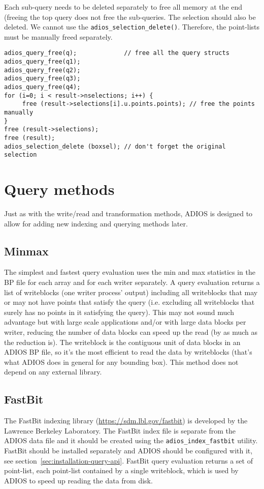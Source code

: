 Each sub-query needs to be deleted separately to free all memory at the end (freeing the top query does not free the sub-queries. The selection should also be deleted. We cannot use the \linebreak \verb+adios_selection_delete()+. Therefore, the point-lists must be manually freed separately. 

\begin{lstlisting}[alsolanguage=C]
adios_query_free(q);             // free all the query structs
adios_query_free(q1);
adios_query_free(q2);
adios_query_free(q3);
adios_query_free(q4);
for (i=0; i < result->nselections; i++) {
     free (result->selections[i].u.points.points); // free the points manually
}
free (result->selections);
free (result);
adios_selection_delete (boxsel); // don't forget the original selection
\end{lstlisting}

%
%
\section{Query methods}

Just as with the write/read and transformation methods, ADIOS is designed to allow for adding new indexing and querying methods later. 

\subsection{Minmax}
The simplest and fastest query evaluation uses the min and max statistics in the BP file for each array and for each writer separately. A query evaluation returns a list of writeblocks (one writer process' output) including all writeblocks that may or may not have points that satisfy the query (i.e. excluding all writeblocks that surely has no points in it satisfying the query). This may not sound much advantage but with large scale applications and/or with large data blocks per writer, reducing the number of data blocks can speed up the read (by as much as the reduction is). The writeblock is the contiguous unit of data blocks in an ADIOS BP file, so it's the most efficient to read the data by writeblocks (that's what ADIOS does in general for any bounding box). This method does not depend on any external library. 

\subsection{FastBit}
The FastBit indexing library (\url{https://sdm.lbl.gov/fastbit}) is developed by the Lawrence Berkeley Laboratory. The FastBit index file is separate from the ADIOS data file and it should be created using the \verb+adios_index_fastbit+ utility. FastBit should be installed separately and ADIOS should be configured with it, see section~\ref{sec:installation-query-api}. FastBit query evaluation returns a set of point-list, each point-list contained by a single writeblock, which is used by ADIOS to speed up reading the data from disk. 


